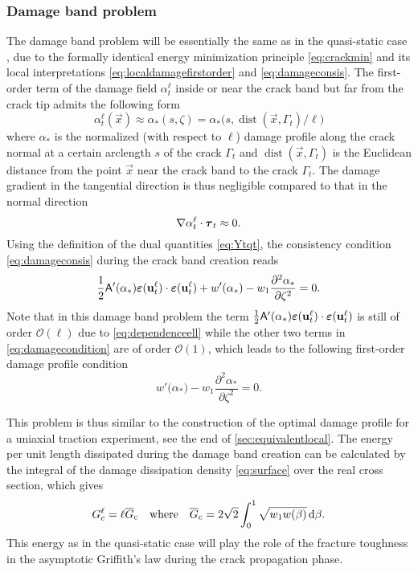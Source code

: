 \subsubsection{Damage band problem}
The damage band problem will be essentially the same as in the quasi-static case \cite{SicsicMarigo:2013}, due to the formally identical energy minimization principle \eqref{eq:crackmin} and its local interpretations \eqref{eq:localdamagefirstorder} and \eqref{eq:damageconsis}. The first-order term of the damage field $\alpha_t^\ell$ inside or near the crack band but far from the crack tip admits the following form
\begin{equation} \label{eq:damageprofile}
\alpha_t^\ell(\vec{x})\approx\alpha_*(s,\zeta)=\alpha_*\bigl(s,\operatorname{dist}(\vec{x},\Gamma_t)/\ell\bigr)
\end{equation}
where $\alpha_*$ is the normalized (with respect to $\ell$) damage profile along the crack normal at a certain arclength $s$ of the crack $\Gamma_t$ and $\operatorname{dist}(\vec{x},\Gamma_t)$ is the Euclidean distance from the point $\vec{x}$ near the crack band to the crack $\Gamma_t$. The damage gradient in the tangential direction is thus negligible compared to that in the normal direction
\begin{equation} \label{eq:tangentialzero}
\nabla\alpha_t^\ell\cdot\vtau_t\approx 0.
\end{equation}
Using the definition of the dual quantities \eqref{eq:Ytqt}, the consistency condition \eqref{eq:damageconsis} during the crack band creation reads
\begin{equation} \label{eq:damagecondition}
\frac{1}{2}\tens{A}'(\alpha_*)\eps(\vec{u}_t^\ell)\cdot\eps(\vec{u}_t^\ell)+w'(\alpha_*)-w_1\frac{\partial^2\alpha_*}{\partial\zeta^2}=0.
\end{equation}
Note that in this damage band problem the term $\frac{1}{2}\tens{A}'(\alpha_*)\eps(\vec{u}_t^\ell)\cdot\eps(\vec{u}_t^\ell)$ is still of order $\mathcal{O}(\ell)$ due to \eqref{eq:dependenceell} while the other two terms in \eqref{eq:damagecondition} are of order $\mathcal{O}(1)$, which leads to the following first-order damage profile condition
\begin{equation} \label{eq:firstorderdamagecondition}
w'\bigl(\alpha_*\bigr)-w_1\frac{\partial^2\alpha_*}{\partial\zeta^2}=0.
\end{equation}

This problem is thus similar to the construction of the optimal damage profile for a uniaxial traction experiment, see the end of \cref{sec:equivalentlocal}. The energy per unit length dissipated during the damage band creation can be calculated by the integral of the damage dissipation density \eqref{eq:surface} over the real cross section, which gives
\begin{equation} \label{eq:gcindamage}
G_\mathrm{c}^\ell=\ell\overline{G}_{\mathrm{c}}\quad\text{where}\quad\overline{G}_{\mathrm{c}}=2\sqrt{2}\int_0^1\sqrt{w_1w(\beta)}\,\mathrm{d}\beta.
\end{equation}
This energy as in the quasi-static case \cite{SicsicMarigo:2013} will play the role of the fracture toughness in the asymptotic Griffith's law during the crack propagation phase.

